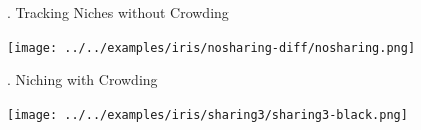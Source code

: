 \documentclass[9pt]{beamer}
\newcommand{\BackgroundImage}[2][0.3] {
  \tikz[remember picture,overlay]
  \node[opacity=#1+0.1, inner sep=0pt] at (current page.center)
       {\texttt{[image: \#2]}};
       \clearpage
}
\begin{document}

\begin{frame}{\theframenumber. Tracking Niches without Crowding}
  \begin{center}
    \texttt{[image: ../../examples/iris/nosharing-diff/nosharing.png]}
  \end{center}
\end{frame}



\begin{frame}{\theframenumber. Niching with Crowding}
  \begin{center}
  \texttt{[image: ../../examples/iris/sharing3/sharing3-black.png]}
  \end{center}
\end{frame}
\end{document}
